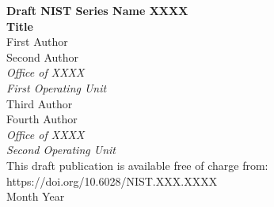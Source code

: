 \documentclass[12pt]{article}
\newcommand{\seriesname}{Series Name\xspace}
\newcommand{\pubnumber}{XXXX}
\newcommand{\DOI}{https://doi.org/10.6028/NIST.XXX.XXXX}
\newcommand{\monthyear}{Month Year}
\begin{document}
\begin{titlepage}
\begin{flushright}
\LARGE{\textbf{Draft NIST \seriesname \pubnumber}}\\
\vfill 
\Huge{\textbf{Title}}\\
    \vfill
    \normalsize First Author\\
     Second Author\\
     \textit{Office of XXXX}\\
     \textit{First Operating Unit}\\
    \vspace{12pt}
     Third Author\\
     Fourth Author\\
     \textit{Office of XXXX}\\
    \textit{Second Operating Unit}\\
\vfill
\normalsize This draft publication is available free of charge from:\\
\DOI\\
\vfill
\normalsize \monthyear
\vfill


\end{flushright}
\end{titlepage}
\end{document}

